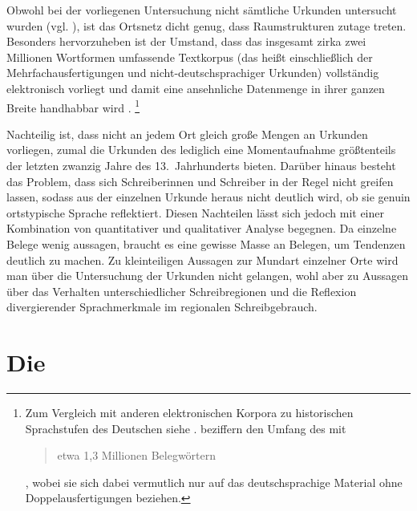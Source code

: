 Obwohl bei der vorliegenen Untersuchung nicht sämtliche Urkunden untersucht
wurden (vgl. ), ist das Ortsnetz dicht genug, dass
Raumstrukturen zutage treten. Besonders hervorzuheben ist
der Umstand, dass das insgesamt zirka zwei Millionen Wortformen umfassende
Textkorpus (das heißt einschließlich der Mehrfachausfertigungen und
nicht-deutschsprachiger Urkunden) vollständig elektronisch vorliegt
\autocites{gniffkerapp2005}{cao-online} und damit eine ansehnliche Datenmenge
in ihrer ganzen Breite handhabbar wird
\autocite{beckerschallert2021,beckerschallert2022b}.%
%
	\footnote{Zum Vergleich mit anderen elektronischen Korpora zu
	historischen Sprachstufen des Deutschen siehe
	\citet{dipper2015}. \citet[391]{gniffkerapp2005} beziffern den Umfang des
	\CAO{} mit \blockquote{etwa 1,3 Millionen Belegwörtern}, wobei sie sich
	dabei vermutlich nur auf das deutschsprachige Material ohne
	Doppelausfertigungen beziehen.} %

Nachteilig ist, dass nicht an jedem Ort gleich große Mengen an Urkunden
vorliegen, zumal die Urkunden des \CAO{} lediglich eine Momentaufnahme
größtenteils der letzten zwanzig Jahre des 13.~Jahrhunderts bieten. Darüber
hinaus besteht das Problem, dass sich Schreiberinnen und Schreiber in der Regel
nicht greifen lassen, sodass aus der einzelnen Urkunde heraus nicht deutlich
wird, ob sie genuin ortstypische Sprache reflektiert. Diesen Nachteilen lässt
sich jedoch mit einer Kombination von quantitativer und qualitativer Analyse
begegnen. Da einzelne Belege wenig aussagen, braucht es eine gewisse Masse an
Belegen, um Tendenzen deutlich zu machen.
Zu kleinteiligen Aus\-sagen zur Mundart einzelner Orte wird man über die
Untersuchung der Urkunden nicht gelangen, wohl aber zu Aussagen über das
Verhalten unterschiedlicher Schreibregionen und die Reflexion divergierender
Sprachmerkmale im regionalen Schreibgebrauch.


\section{Die }
\label{sec:materialkc}

